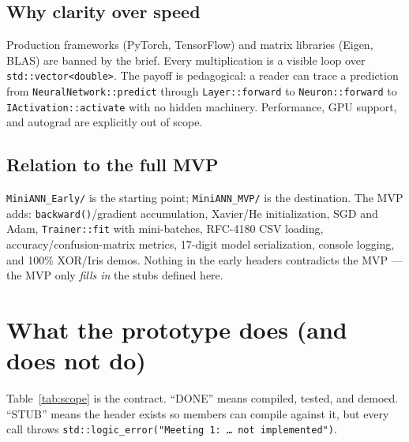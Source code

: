 \documentclass[11pt,a4paper]{article}
\begin{document}
\subsection{Why clarity over speed}
Production frameworks (PyTorch, TensorFlow) and matrix libraries (Eigen, BLAS) are banned by the
brief. Every multiplication is a visible loop over \texttt{std::vector<double>}. The payoff is
pedagogical: a reader can trace a prediction from \texttt{NeuralNetwork::predict} through
\texttt{Layer::forward} to \texttt{Neuron::forward} to \texttt{IActivation::activate} with no
hidden machinery. Performance, GPU support, and autograd are explicitly out of scope.

\subsection{Relation to the full MVP}
\texttt{MiniANN\_Early/} is the starting point; \texttt{MiniANN\_MVP/} is the destination. The
MVP adds: \texttt{backward()}/gradient accumulation, Xavier/He initialization, SGD and Adam,
\texttt{Trainer::fit} with mini-batches, RFC-4180 CSV loading, accuracy/confusion-matrix metrics,
17-digit model serialization, console logging, and 100\% XOR/Iris demos. Nothing in the early
headers contradicts the MVP --- the MVP only \emph{fills in} the stubs defined here.

\section{What the prototype does (and does not do)}
Table~\ref{tab:scope} is the contract. ``DONE'' means compiled, tested, and demoed.
``STUB'' means the header exists so members can compile against it, but every call throws
\texttt{std::logic\_error("Meeting 1: \dots\ not implemented")}.
\end{document}
